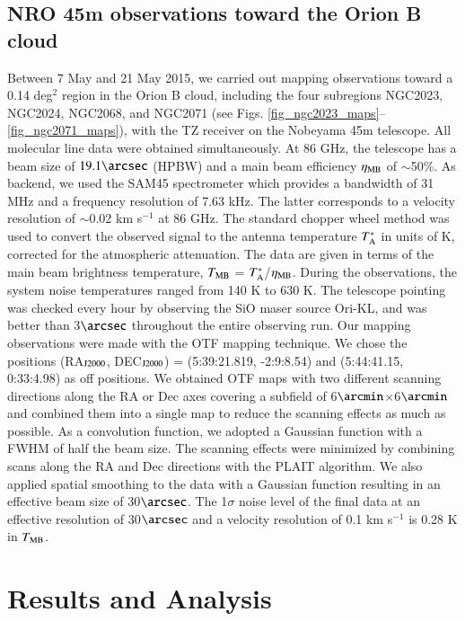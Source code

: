 \documentclass{aa}
\begin{document}
\subsection{NRO 45m observations toward the Orion B cloud}
Between 7 May and 21 May 2015, we carried out mapping observations toward a 0.14 deg$^2$ region in the Orion B cloud, {including the four subregions NGC2023, NGC2024, NGC2068, and NGC2071 (see Figs. \ref{fig_ngc2023_maps}--\ref{fig_ngc2071_maps}),} with the TZ receiver on the Nobeyama 45m telescope. All molecular line data were obtained simultaneously.  At 86 GHz, the telescope has a beam size of $19.1\arcsec$ (HPBW) and a main beam efficiency $\eta_{\rm MB}$ of $\sim$50\%.  As backend, we used the SAM45 spectrometer which provides a bandwidth of 31 MHz and a frequency resolution of 7.63 kHz. 
The latter corresponds to a velocity resolution of $\sim$0.02 km s$^{-1}$ at 86 GHz. The standard chopper wheel method was used to convert the observed signal to the antenna temperature $T_{\rm A}^*$ in units of K, corrected for the atmospheric attenuation. 
The data are given in terms of the main beam brightness temperature, $T_{\rm MB}$ = $T_{\rm A}^*$/$\eta_{\rm MB}$. 
During the observations, the system noise temperatures ranged from 140 K to 630 K. 
The telescope pointing was checked every hour by observing the SiO maser source Ori-KL, and was better than 3$\arcsec$ throughout the entire observing run.  
Our mapping observations were made with the OTF mapping technique. 
We chose the positions (RA$_{\rm J2000}$, DEC$_{\rm J2000}$) = (5:39:21.819, -2:9:8.54) and (5:44:41.15, 0:33:4.98) as off positions. 
We obtained OTF maps with two different scanning directions along the RA or Dec axes covering 
a subfield of 6$\arcmin$$\times$6$\arcmin$ and combined them into a single map to reduce the scanning effects as much as possible.  
As a convolution function, we adopted a Gaussian function with a FWHM of half the beam size. The scanning effects were minimized 
by combining scans along the RA and Dec directions with the \citet{Emerson88} PLAIT algorithm. We also applied spatial smoothing 
to the data with a Gaussian function resulting in an effective beam size of 30$\arcsec$. The 1$\sigma$ noise level of the final data at an effective 
resolution of 30$\arcsec$ and a velocity resolution of 0.1 km s$^{-1}$ is 0.28 K in $T_{\rm MB}$. 




\section{Results and Analysis}
\end{document}
